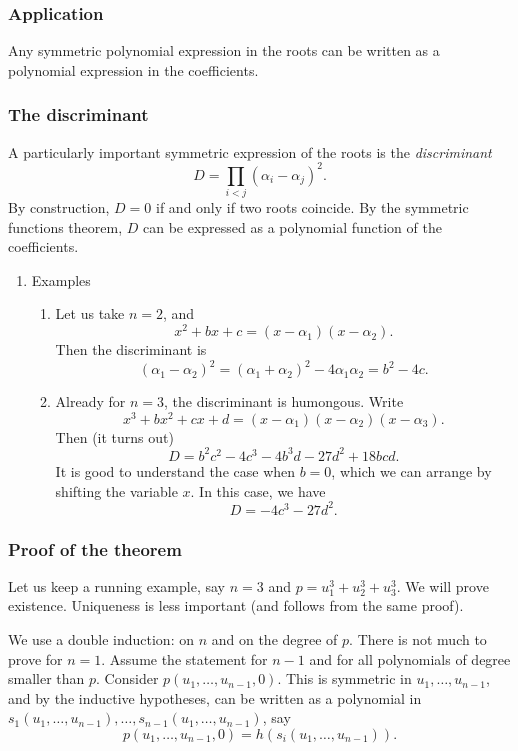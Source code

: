 \documentclass[11pt]{article}
\begin{document}
\subsubsection{Application}
\label{sec:org7c430d8}
Any symmetric polynomial expression in the roots can be written as a polynomial expression in the coefficients.
\subsubsection{The discriminant}
\label{sec:orge49c1fc}
A particularly important symmetric expression of the roots is the \emph{discriminant}
\[ D = \prod_{i<j} (\alpha_{i} - \alpha_{j})^{2}.\]
By construction, \(D = 0\) if and only if two roots coincide.
By the symmetric functions theorem, \(D\) can be expressed as a polynomial function of the coefficients.
\begin{enumerate}
\item Examples
\label{sec:org5bbf6d2}
\begin{enumerate}
\item Let us take \(n = 2\), and
\[ x^2 +bx + c = (x-\alpha_{1})(x-\alpha_{2}).\]
Then the discriminant is
\[ (\alpha_{1}-\alpha_{2})^2 = (\alpha_{1}+\alpha_{2})^2 - 4\alpha_{1}\alpha_{2} = b^{2}-4c.\]
\item Already for \(n = 3\), the discriminant is humongous.
Write
\[ x^{3} + bx^{2} + cx + d = (x-\alpha_{1})(x-\alpha_{2})(x-\alpha_{3}).\]
Then (it turns out)
\[ D = b^2c^2-4c^3-4b^3d-27d^2+18bcd.\]
It is good to understand the case when \(b = 0\), which we can arrange by shifting the variable \(x\).
In this case, we have
\[ D = -4c^3-27d^2.\]
\end{enumerate}
\end{enumerate}
\subsubsection{Proof of the theorem}
\label{sec:orgaf56337}

Let us keep a running example, say \(n = 3\) and \(p = u_{1}^3+u_{2}^3+u_{3}^{3}\).
We will prove existence.  Uniqueness is less important (and follows from the same proof).

We use a double induction: on \(n\) and on the degree of \(p\).
There is not much to prove for \(n = 1\).
Assume the statement for \(n-1\) and for all polynomials of degree smaller than \(p\).
Consider \(p(u_{1}, \dots, u_{n-1},0)\).
This is symmetric in \(u_{1}, \dots, u_{n-1}\), and by the inductive hypotheses, can be written as a polynomial in \(s_{1}(u_{1}, \dots, u_{n-1}), \dots, s_{n-1}(u_{1}, \dots, u_{n-1})\), say
\[ p(u_{1}, \dots, u_{n-1}, 0) = h(s_{i}(u_{1}, \dots, u_{n-1})).\]
\end{document}
